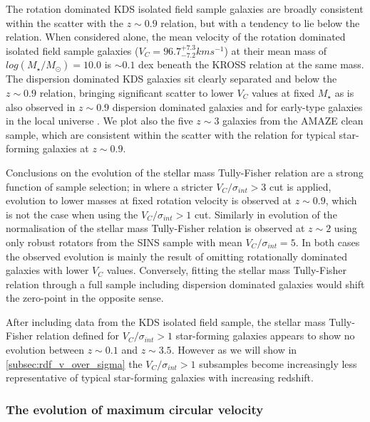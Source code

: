\documentclass[fleqn,usenatbib]{mn2e}
\begin{document}
The rotation dominated KDS isolated field sample galaxies are broadly consistent within the scatter with the $z\sim 0.9$ relation, but with a tendency to lie below the relation.
When considered alone, the mean velocity of the rotation dominated isolated field sample galaxies ($V_{C} = 96.7^{+7.3}_{-7.2}kms^{-1}$) at their mean mass of $log(M_{\star}/M_{\odot})=10.0$ is $\sim0.1$ dex beneath the KROSS relation at the same mass.
The dispersion dominated KDS galaxies sit clearly separated and below the $z\sim0.9$ relation, bringing significant scatter to lower $V_{C}$ values at fixed $M_{\star}$ as is also observed in $z\sim0.9$ dispersion dominated galaxies and for early-type galaxies in the local universe \citep[e.g.][]{Romanowsky2012}. 
We plot also the five $z\sim3$ galaxies from the AMAZE clean sample, which are consistent within the scatter with the relation for typical star-forming galaxies at $z\sim0.9$.

Conclusions on the evolution of the stellar mass Tully-Fisher relation are a strong function of sample selection; in \cite{Tiley2016a} where a stricter $V_{C}/\sigma_{int} > 3$ cut is applied, evolution to lower masses at fixed rotation velocity is observed at $z\sim0.9$, which is not the case when using the $V_{C}/\sigma_{int} > 1$ cut.
Similarly in \cite{Cresci2009} evolution of the normalisation of the stellar mass Tully-Fisher relation is observed at $z\sim2$ using only robust rotators from the SINS sample with mean $V_{C}/\sigma_{int} = 5$.
In both cases the observed evolution is mainly the result of omitting rotationally dominated galaxies with lower $V_{C}$ values.
Conversely, fitting the stellar mass Tully-Fisher relation through a full sample including dispersion dominated galaxies would shift the zero-point in the opposite sense.

After including data from the KDS isolated field sample, the stellar mass Tully-Fisher relation defined for $V_{C}/\sigma_{int} > 1$ star-forming galaxies appears to show no evolution between $z\sim0.1$ and $z\sim3.5$.
However as we will show in \cref{subsec:rdf_v_over_sigma} the $V_{C}/\sigma_{int} > 1$ subsamples become increasingly less representative of typical star-forming galaxies with increasing redshift.  

\subsubsection{The evolution of maximum circular velocity}\label{subsubsec:v_evolution}
\end{document}
